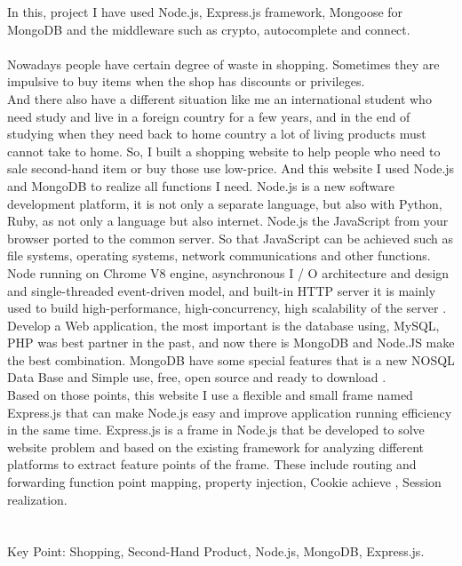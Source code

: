 In this, project I have used Node.js, Express.js framework, Mongoose for MongoDB and the middleware such as crypto, autocomplete and connect.\\
\\
Nowadays people have certain degree of waste in shopping. Sometimes they are impulsive to buy items when the shop has discounts or privileges.\\
And there also have a different situation like me an international student who need study and live in a foreign country for a few years, and in the end of studying when they need back to home country a lot of living products must cannot take to home. So, I built a shopping website to help people who need to sale second-hand item or buy those use low-price. And this website I used Node.js and MongoDB to realize all functions I need. Node.js is a new software development platform, it is not only a separate language, but also with Python, Ruby, as not only a language but also internet. Node.js the JavaScript from your browser ported to the common server. So that JavaScript can be achieved such as file systems, operating systems, network communications and other functions. Node running on Chrome V8 engine, asynchronous I / O architecture and design and single-threaded event-driven model, and built-in HTTP server it is mainly used to build high-performance, high-concurrency, high scalability of the server \cite{1}. Develop a Web application, the most important is the database using, MySQL, PHP was best partner in the past, and now there is MongoDB and Node.JS make the best combination. MongoDB have some special features that is a new NOSQL Data Base and Simple use, free, open source and ready to download \cite{2}.  \\
Based on those points, this website I use a flexible and small frame named Express.js that can make Node.js easy and improve application running efficiency in the same time. Express.js is a frame in Node.js that be developed to solve website problem and based on the existing framework for analyzing different platforms to extract feature points of the frame. These include routing and forwarding function point mapping, property injection, Cookie achieve , Session realization. \\
\\
\\
Key Point: Shopping, Second-Hand Product, Node.js, MongoDB, Express.js.\\
